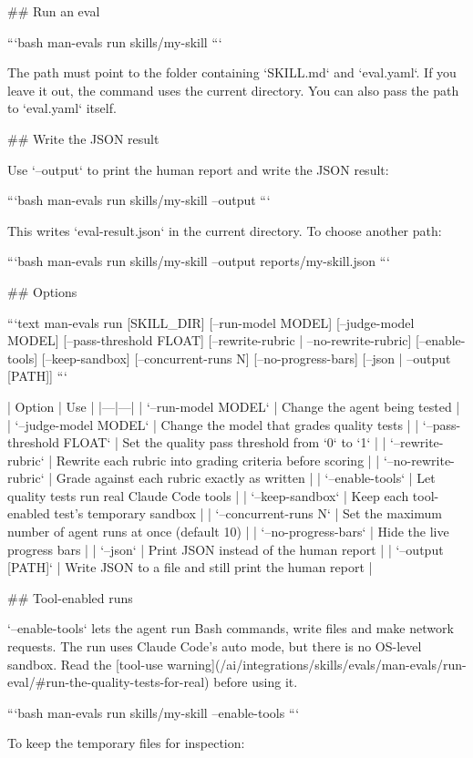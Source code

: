## Run an eval

```bash
man-evals run skills/my-skill
```

The path must point to the folder containing `SKILL.md` and `eval.yaml`.
If you leave it out, the command uses the current directory.
You can also pass the path to `eval.yaml` itself.

## Write the JSON result

Use `--output` to print the human report and write the JSON result:

```bash
man-evals run skills/my-skill --output
```

This writes `eval-result.json` in the current directory.
To choose another path:

```bash
man-evals run skills/my-skill --output reports/my-skill.json
```

## Options

```text
man-evals run [SKILL_DIR] [--run-model MODEL] [--judge-model MODEL]
              [--pass-threshold FLOAT] [--rewrite-rubric | --no-rewrite-rubric]
              [--enable-tools] [--keep-sandbox] [--concurrent-runs N]
              [--no-progress-bars] [--json | --output [PATH]]
```

| Option | Use |
|---|---|
| `--run-model MODEL` | Change the agent being tested |
| `--judge-model MODEL` | Change the model that grades quality tests |
| `--pass-threshold FLOAT` | Set the quality pass threshold from `0` to `1` |
| `--rewrite-rubric` | Rewrite each rubric into grading criteria before scoring |
| `--no-rewrite-rubric` | Grade against each rubric exactly as written |
| `--enable-tools` | Let quality tests run real Claude Code tools |
| `--keep-sandbox` | Keep each tool-enabled test's temporary sandbox |
| `--concurrent-runs N` | Set the maximum number of agent runs at once (default 10) |
| `--no-progress-bars` | Hide the live progress bars |
| `--json` | Print JSON instead of the human report |
| `--output [PATH]` | Write JSON to a file and still print the human report |

## Tool-enabled runs

`--enable-tools` lets the agent run Bash commands, write files and make network requests.
The run uses Claude Code's auto mode, but there is no OS-level sandbox.
Read the [tool-use warning](/ai/integrations/skills/evals/man-evals/run-eval/#run-the-quality-tests-for-real) before using it.

```bash
man-evals run skills/my-skill --enable-tools
```

To keep the temporary files for inspection:

